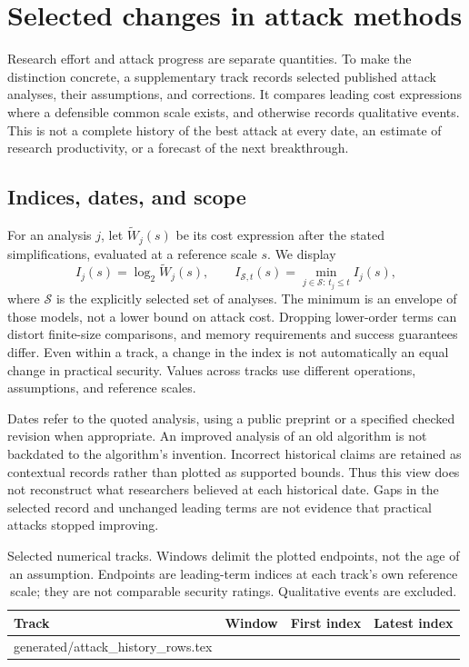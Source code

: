 \section{Selected changes in attack methods}
\label{sec:attack-history}
Research effort and attack progress are separate quantities. To make the distinction concrete, a supplementary track records selected published attack analyses, their assumptions, and corrections. It compares leading cost expressions where a defensible common scale exists, and otherwise records qualitative events. This is not a complete history of the best attack at every date, an estimate of research productivity, or a forecast of the next breakthrough.

\subsection{Indices, dates, and scope}
For an analysis $j$, let $\widetilde W_j(s)$ be its cost expression after the stated simplifications, evaluated at a reference scale $s$. We display
\begin{equation}
 I_j(s)=\log_2\widetilde W_j(s),\qquad
 I_{\mathcal S,t}(s)=\min_{j\in\mathcal S:\,t_j\leq t} I_j(s),
 \label{eq:attack-index}
\end{equation}
where $\mathcal S$ is the explicitly selected set of analyses. The minimum is an envelope of those models, not a lower bound on attack cost. Dropping lower-order terms can distort finite-size comparisons, and memory requirements and success guarantees differ. Even within a track, a change in the index is not automatically an equal change in practical security. Values across tracks use different operations, assumptions, and reference scales.

Dates refer to the quoted analysis, using a public preprint or a specified checked revision when appropriate. An improved analysis of an old algorithm is not backdated to the algorithm's invention. Incorrect historical claims are retained as contextual records rather than plotted as supported bounds. Thus this view does not reconstruct what researchers believed at each historical date. Gaps in the selected record and unchanged leading terms are not evidence that practical attacks stopped improving.

\begin{table}[htbp]
\centering\small
\caption{Selected numerical tracks. Windows delimit the plotted endpoints, not the age of an assumption. Endpoints are leading-term indices at each track's own reference scale; they are not comparable security ratings. Qualitative events are excluded.}
\label{tab:attack-history}
\begin{tabularx}{\linewidth}{@{}Yrrr@{}}\toprule
Track & Window & First index & Latest index\\\midrule
{} generated/attack_history_rows.tex
\bottomrule\end{tabularx}
\end{table}

